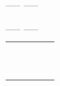 \documentclass[11pt,a4paper]{article}
\begin{document}

\begin{table}[!ht]
  \centering
  \begin{minipage}{0.08\textwidth}
    \centering

\vfillFirst

\_\_  \_\_


\vfillLast

  \end{minipage}
  \hfillx
  \begin{minipage}{0.37\textwidth}
    \centering

\begin{center}

\_\_  \_\_


\medskip


\begin{tabular}{|C{0.75cm} | C{0.75cm}|C{0.75cm}|C{0.75cm}|C{0.75cm}|}
\hline
{}  &   &  &  &  \\
  &   &  &  &  \\
\hline
{}  &  & & & \\
  &  & & & \\ \hline
{}  &  & & & \\
  &  & & & \\ \hline
{}  &  & & & \\
  &  & & & \\ \hline
{}  &  & & & \\
  &  & & & \\ \hline
\end{tabular}
\end{center}

  \end{minipage}
  \hfillx
  \begin{minipage}{0.55\textwidth}
    \centering

\vfillFirst

\phantom{42}


\vfillLast

  \end{minipage}
\end{table}
\end{document}
